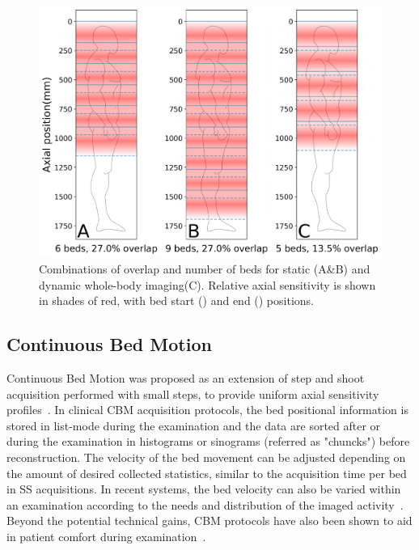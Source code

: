 %
%
\begin{figure} [ht!]
\centering
\includegraphics[scale=0.5,angle=0]{3_Results/3_1_DWB_Optimization/figures/SensitivityProfiles_overHuman.png}
\caption{Combinations of overlap and number of beds for static (A\&B) and dynamic whole-body imaging(C). Relative axial sensitivity is shown in shades of red, with bed start (\protect{}) and end (\protect{}) positions.} 
\label{fig3_1:BodyCoverage}
\end{figure}
%
%
%
\subsection{Continuous Bed Motion}
Continuous Bed Motion was proposed as an extension of step and shoot acquisition performed with small steps, to provide uniform axial sensitivity profiles~\cite{Dahlbom2001,Brasse2002}. In clinical CBM acquisition protocols, the bed positional information is stored in list-mode during the examination and the data are sorted after or during the examination in histograms or sinograms (referred as "chuncks") before reconstruction. The velocity of the bed movement can be adjusted depending on the amount of desired collected statistics, similar to the acquisition time per bed in SS acquisitions. In recent systems, the bed velocity can also be varied within an examination according to the needs and distribution of the imaged activity~\cite{Panin2014}. Beyond the potential technical gains, CBM protocols have also been shown to aid in patient comfort during examination~\cite{Schatka2016}. 
%
